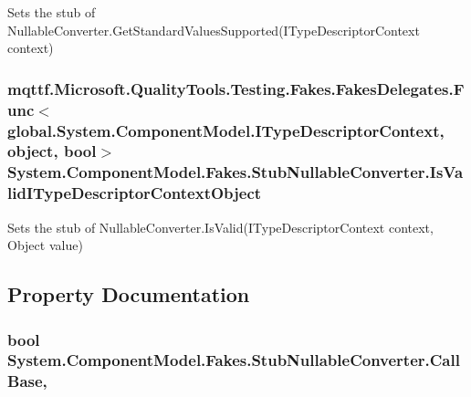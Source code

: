 Sets the stub of Nullable\-Converter.\-Get\-Standard\-Values\-Supported(\-I\-Type\-Descriptor\-Context context)

\hypertarget{class_system_1_1_component_model_1_1_fakes_1_1_stub_nullable_converter_a758197cacd1b441cc454fbb28071a9f3}{
\subsubsection[{Is\-Valid\-I\-Type\-Descriptor\-Context\-Object}]{\setlength{\rightskip}{0pt plus 5cm}mqttf.\-Microsoft.\-Quality\-Tools.\-Testing.\-Fakes.\-Fakes\-Delegates.\-Func$<$global.\-System.\-Component\-Model.\-I\-Type\-Descriptor\-Context, object, bool$>$ System.\-Component\-Model.\-Fakes.\-Stub\-Nullable\-Converter.\-Is\-Valid\-I\-Type\-Descriptor\-Context\-Object}}\label{class_system_1_1_component_model_1_1_fakes_1_1_stub_nullable_converter_a758197cacd1b441cc454fbb28071a9f3}


Sets the stub of Nullable\-Converter.\-Is\-Valid(\-I\-Type\-Descriptor\-Context context, Object value)



\subsection{Property Documentation}
\hypertarget{class_system_1_1_component_model_1_1_fakes_1_1_stub_nullable_converter_acacbcf6f26a50b784ba4dbb8bada224a}{
\subsubsection[{Call\-Base}]{\setlength{\rightskip}{0pt plus 5cm}bool System.\-Component\-Model.\-Fakes.\-Stub\-Nullable\-Converter.\-Call\-Base\hspace{0.3cm}{\ttfamily [get]}, {\ttfamily [set]}}}\label{class_system_1_1_component_model_1_1_fakes_1_1_stub_nullable_converter_acacbcf6f26a50b784ba4dbb8bada224a}


